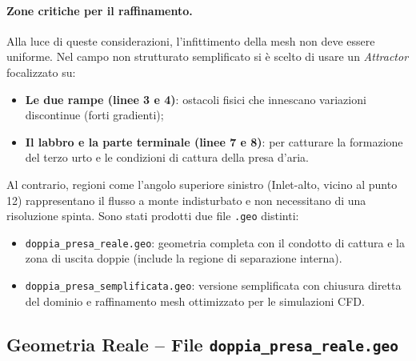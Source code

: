 \paragraph{Zone critiche per il raffinamento.}
Alla luce di queste considerazioni, l'infittimento della mesh non deve essere uniforme. Nel campo non strutturato semplificato si è scelto di usare un \emph{Attractor} focalizzato su:
\begin{itemize}
    \item \textbf{Le due rampe (linee 3 e 4)}: ostacoli fisici che innescano variazioni discontinue (forti gradienti);
    \item \textbf{Il labbro e la parte terminale (linee 7 e 8)}: per catturare la formazione del terzo urto e le condizioni di cattura della presa d'aria.
\end{itemize}
Al contrario, regioni come l'angolo superiore sinistro (Inlet-alto, vicino al punto 12) rappresentano il flusso a monte indisturbato e non necessitano di una risoluzione spinta. 
Sono stati prodotti due file \texttt{.geo} distinti:
\begin{itemize}
  \item \texttt{doppia\_presa\_reale.geo}: geometria completa con il condotto di cattura
    e la zona di uscita doppie (include la regione di separazione interna).
  \item \texttt{doppia\_presa\_semplificata.geo}: versione semplificata con chiusura diretta
    del dominio e raffinamento mesh ottimizzato per le simulazioni CFD.
\end{itemize}

\subsection{Geometria Reale -- File \texttt{doppia\_presa\_reale.geo}}
\label{sec:presa_reale}

